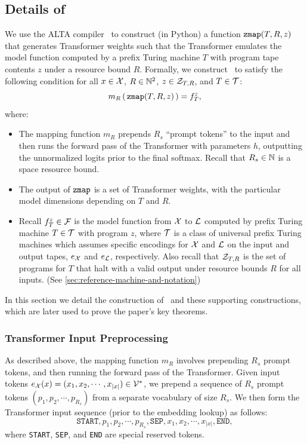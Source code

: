 \subsection{Details of \zmap}
\label{sec:zmap-details}


We use the ALTA compiler~\citep{shaw2024alta} to construct (in Python) a function $\texttt{zmap}(T,R,z)$ that generates Transformer weights such that the Transformer emulates the model function computed by a prefix Turing machine $T$ with program tape contents $z$ under a resource bound $R$.
Formally, we construct \zmap~to satisfy the following condition for all $x \in {\mathcal{X}}$, $R \in {\mathbb{N}^2}$, $z \in {\mathcal{Z}}_{T,R}$, and $T \in {\mathcal{T}}$:
\begin{equation}
m_R \left(\, \texttt{zmap}(T, R, z) \,\right) = f^z_T,
\label{eq:zmap-conditions}
\end{equation}
where:
\begin{itemize}
    \item The mapping function $m_R$ prepends $R_s$ ``prompt tokens'' to the input and then runs the forward pass of the Transformer with parameters $h$, outputting the unnormalized logits prior to the final softmax. Recall that $R_s \in \mathbb{N}$ is a space resource bound.
    \item The output of $\texttt{zmap}$ is a set of Transformer weights, with the particular model dimensions depending on $T$ and $R$.
    \item Recall $f^z_T \in {\mathcal{F}}$ is the model function from ${\mathcal{X}}$ to ${\mathcal{L}}$ computed by prefix Turing machine $T \in {\mathcal{T}}$ with program $z$, where ${\mathcal{T}}$ is a class of universal prefix Turing machines which assumes specific encodings for ${\mathcal{X}}$ and ${\mathcal{L}}$ on the input and output tapes, $e_{\mathcal{X}}$ and $e_{\mathcal{L}}$, respectively. Also recall that ${\mathcal{Z}}_{T,R}$ is the set of programs for $T$ that halt with a valid output under resource bounds $R$ for all inputs. (See \ref{sec:reference-machine-and-notation})

\end{itemize}

In this section we detail the construction of \zmap~and these supporting constructions, which are later used to prove the paper's key theorems.

\subsubsection{Transformer Input Preprocessing}

As described above, the mapping function $m_R$ involves prepending $R_s$ prompt tokens, and then running the forward pass of the Transformer.
Given input tokens $e_{\mathcal{X}}(x) = (x_1, x_2, \cdots, x_{|x|}) \in {\mathcal{V}}^*$, we prepend a sequence of $R_s$ prompt tokens $(p_1, p_2, \cdots, p_{R_s})$ from a separate vocabulary of size $R_s$. We then form the Transformer input sequence (prior to the embedding lookup) as follows:
\begin{equation}
    \texttt{START}, p_1, p_2, \cdots, p_{R_s}, \texttt{SEP}, x_1, x_2, \cdots, x_{|x|}, \texttt{END},
\end{equation}
where \texttt{START}, \texttt{SEP}, and \texttt{END} are special reserved tokens.


